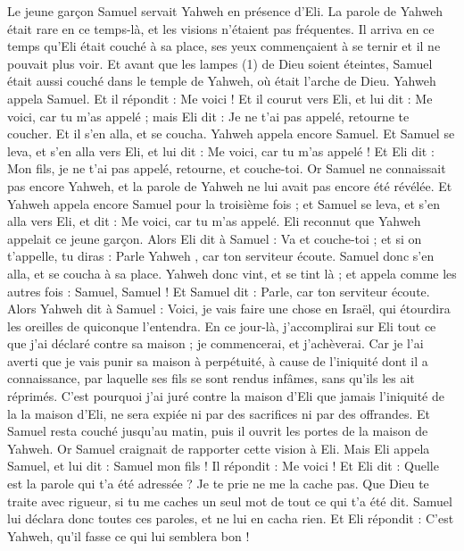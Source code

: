 \begin{multicols}{2}
\VerseOne{}Le jeune garçon Samuel servait Yahweh en présence d'Eli. La parole de Yahweh était rare en ce temps-là, et les visions n’étaient pas fréquentes.
Il arriva en ce temps qu'Eli était couché à sa place, ses yeux commençaient à se ternir et il ne pouvait plus voir.
Et avant que les lampes (1) de Dieu soient éteintes, Samuel était aussi couché dans le temple de Yahweh, où était l'arche de Dieu.
Yahweh appela Samuel. Et il répondit : Me voici !
Et il courut vers Eli, et lui dit : Me voici, car tu m'as appelé ; mais Eli dit : Je ne t'ai pas appelé, retourne te coucher. Et il s'en alla, et se coucha.
Yahweh appela encore Samuel. Et Samuel se leva, et s'en alla vers Eli, et lui dit : Me voici, car tu m'as appelé ! Et Eli dit : Mon fils, je ne t'ai pas appelé, retourne, et couche-toi.
Or Samuel ne connaissait pas encore Yahweh, et la parole de Yahweh ne lui avait pas encore été révélée.
Et Yahweh appela encore Samuel pour la troisième fois ; et Samuel se leva, et s'en alla vers Eli, et dit : Me voici, car tu m'as appelé. Eli reconnut que Yahweh appelait ce jeune garçon.
Alors Eli dit à Samuel : Va et couche-toi ; et si on t'appelle, tu diras : Parle Yahweh , car ton serviteur écoute. Samuel donc s'en alla, et se coucha à sa place.
Yahweh donc vint, et se tint là ; et appela comme les autres fois : Samuel, Samuel ! Et Samuel dit : Parle, car ton serviteur écoute.
Alors Yahweh dit à Samuel : Voici, je vais faire une chose en Israël, qui étourdira les oreilles de quiconque l’entendra.
En ce jour-là, j’accomplirai sur Eli tout ce que j’ai déclaré contre sa maison ; je commencerai, et j’achèverai.
Car je l'ai averti que je vais punir sa maison à perpétuité, à cause de l'iniquité dont il a connaissance, par laquelle ses fils se sont rendus infâmes, sans qu’ils les ait réprimés.
C'est pourquoi j'ai juré contre la maison d'Eli que jamais l’iniquité de la la maison d'Eli, ne sera expiée ni par des sacrifices ni par des offrandes.
Et Samuel resta couché jusqu'au matin, puis il ouvrit les portes de la maison de Yahweh. Or Samuel craignait de rapporter cette vision à Eli.
Mais Eli appela Samuel, et lui dit : Samuel mon fils ! Il répondit : Me voici !
Et Eli dit : Quelle est la parole qui t'a été adressée ? Je te prie ne me la cache pas. Que Dieu te traite avec rigueur, si tu me caches un seul mot de tout ce qui t'a été dit.
Samuel lui déclara donc toutes ces paroles, et ne lui en cacha rien. Et Eli répondit : C'est Yahweh, qu'il fasse ce qui lui semblera bon !

\end{multicols}
